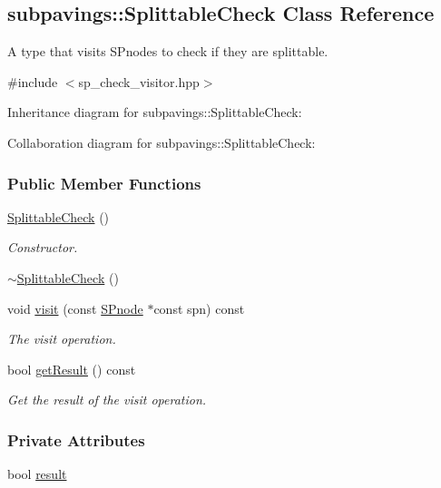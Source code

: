 \hypertarget{classsubpavings_1_1SplittableCheck}{\subsection{subpavings\-:\-:\-Splittable\-Check \-Class \-Reference}
\label{classsubpavings_1_1SplittableCheck}
}


\-A type that visits  \-S\-Pnodes to check if they are splittable.  




{\ttfamily \#include $<$sp\-\_\-check\-\_\-visitor.\-hpp$>$}



\-Inheritance diagram for subpavings\-:\-:\-Splittable\-Check\-:


\-Collaboration diagram for subpavings\-:\-:\-Splittable\-Check\-:
\subsubsection*{\-Public \-Member \-Functions}
\begin{DoxyCompactItemize}
\item 
\hyperlink{classsubpavings_1_1SplittableCheck_a267ba85ab1520b5f70dec3d3c049d467}{\-Splittable\-Check} ()
\begin{DoxyCompactList}\small\item\em \-Constructor. \end{DoxyCompactList}\item 
\hyperlink{classsubpavings_1_1SplittableCheck_ab4597cc8f9818adfbf00074b5343f870}{$\sim$\-Splittable\-Check} ()
\item 
void \hyperlink{classsubpavings_1_1SplittableCheck_a67b0655c14ae3573fd8f9c954491c51e}{visit} (const \hyperlink{classsubpavings_1_1SPnode}{\-S\-Pnode} $\ast$const spn) const 
\begin{DoxyCompactList}\small\item\em \-The visit operation. \end{DoxyCompactList}\item 
bool \hyperlink{classsubpavings_1_1SplittableCheck_a9b48f6f958be90822fcb39b8ec053a09}{get\-Result} () const 
\begin{DoxyCompactList}\small\item\em \-Get the result of the visit operation. \end{DoxyCompactList}\end{DoxyCompactItemize}
\subsubsection*{\-Private \-Attributes}
\begin{DoxyCompactItemize}
\item 
bool \hyperlink{classsubpavings_1_1SplittableCheck_aafe6ff513102db00eac0f1e5ed07e91c}{result}
\end{DoxyCompactItemize}


